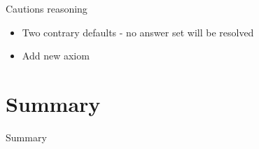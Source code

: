 \documentclass{beamer}
\begin{document}
  
  \begin{frame}{Cautions reasoning}
    \begin{itemize}
      \item Two contrary defaults - no answer set will be resolved
      \item Add new axiom
    \end{itemize}
  \end{frame}
  
  
  
  
  
\section*{Summary}

\begin{frame}{Summary}
%
%  
\end{frame}
\end{document}
